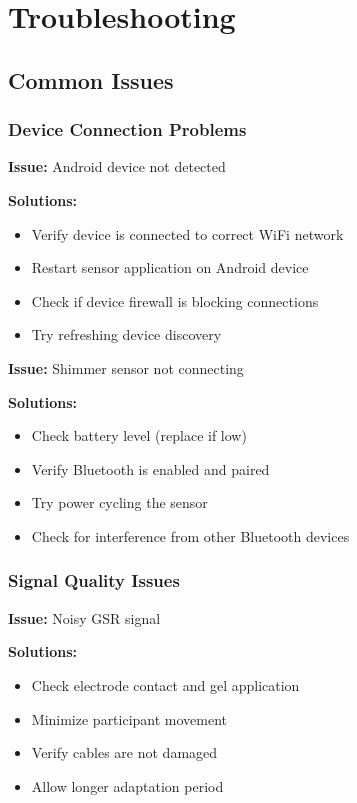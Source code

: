 \section{Troubleshooting}

\subsection{Common Issues}

\subsubsection{Device Connection Problems}

\textbf{Issue:} Android device not detected

\textbf{Solutions:}
\begin{itemize}
\item Verify device is connected to correct WiFi network
\item Restart sensor application on Android device
\item Check if device firewall is blocking connections
\item Try refreshing device discovery
\end{itemize}

\textbf{Issue:} Shimmer sensor not connecting

\textbf{Solutions:}
\begin{itemize}
\item Check battery level (replace if low)
\item Verify Bluetooth is enabled and paired
\item Try power cycling the sensor
\item Check for interference from other Bluetooth devices
\end{itemize}

\subsubsection{Signal Quality Issues}

\textbf{Issue:} Noisy GSR signal

\textbf{Solutions:}
\begin{itemize}
\item Check electrode contact and gel application
\item Minimize participant movement
\item Verify cables are not damaged
\item Allow longer adaptation period
\end{itemize}

